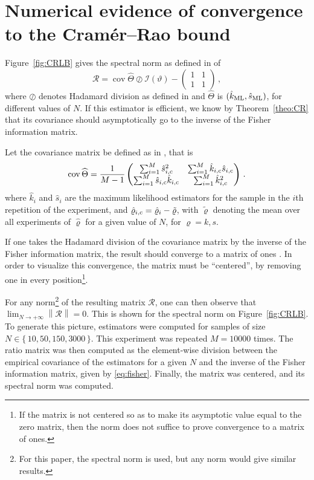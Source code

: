 \documentclass[final]{aomart}
\newtheorem[{}\it]{thm}{Theorem}[section]
\theoremstyle{definition}
\newtheorem*[{}\it]{notation}{Notation}
\numberwithin{equation}{section}
\newcommand{\wh}{\widehat}
\renewcommand{\theta}{\vartheta}
\renewcommand{\rho}{\varrho}
\newcommand{\hTheta}{\wh{\Theta}} %
\newcommand{\fisher}{\mathcal{I}} %
\DeclareMathOperator{\cov}{cov}
\newcommand{\enVert}[1]{\left\lVert#1\right\rVert}
\let\norm=\enVert
\begin{document}
\section{Numerical evidence of convergence to the Cramér--Rao bound}
\label{sec:ratio}
Figure~\ref{fig:CRLB} gives the spectral norm as defined in \cite{wiki:spectral} of
\begin{equation}
\mathscr{R} = \cov \hTheta \oslash \fisher(\theta) - \begin{pmatrix} 1&1\\1&1 \end{pmatrix}\,,
\end{equation}
where \(\oslash\) denotes Hadamard division as defined in \cite{wiki:hadamard} and \(\hTheta\) is \((\hat{k}_{\textnormal{ML}}, \hat{s}_{\textnormal{ML}})\), for different values of \(N\).
If this estimator is efficient, we know by Theorem~\ref{theo:CR} that its covariance should asymptotically go to the inverse of the Fisher information matrix.

Let the covariance matrix be defined as in \cite{wiki:scm}, that is
\begin{equation}
\cov \hTheta = \frac{1}{M-1} \begin{pmatrix} \sum_{i=1}^M \hat{s}_{i, \textnormal{c}}^2 & \sum_{i=1}^M \hat{k}_{i, \textnormal{c}} \hat{s}_{i, \textnormal{c}} \\ \sum_{i=1}^M \hat{s}_{i, \textnormal{c}} \hat{k}_{i, \textnormal{c}} & \sum_{i=1}^M \hat{k}_{i, \textnormal{c}}^2 \end{pmatrix}\,.
\end{equation}
where \(\hat{k}_i\) and \(\hat{s}_i\) are the maximum likelihood estimators for the sample in the \(i\)th repetition of the experiment, and \(\hat{\rho}_{i, \textnormal{c}} = \hat{\rho}_i - \tilde{\rho}\), with \(\tilde{\rho}\) denoting the mean over all experiments of \(\hat{\rho}\) for a given value of \(N\), for \(\rho = k, s\).

If one takes the Hadamard division of the covariance matrix by the inverse of the Fisher information matrix, the result should converge to a matrix of ones \cite{wiki:hadamard}.
In order to visualize this convergence, the matrix must be ``centered'', by removing one in every position\footnote{If the matrix is not centered so as to make its asymptotic value equal to the zero matrix, then the norm does not suffice to prove convergence to a matrix of ones.}.

For any norm\footnote{For this paper, the spectral norm is used, but any norm would give similar results.} of the resulting matrix \(\mathscr{R}\), one can then observe that \(\lim_{N \to +\infty} \norm{\mathscr{R}} = 0\).
This is shown for the spectral norm on Figure~\ref{fig:CRLB}.
To generate this picture, estimators were computed for samples of size \(N \in \{\,10, 50, 150, 3000\,\}\).
This experiment was repeated \(M = 10000\) times.
The ratio matrix was then computed as the element-wise division between the empirical covariance of the estimators for a given \(N\) and the inverse of the Fisher information matrix, given by \eqref{eq:fisher}.
Finally, the matrix was centered, and its spectral norm was computed.
\end{document}
